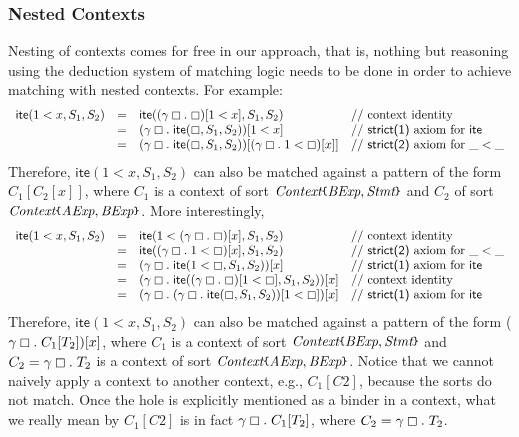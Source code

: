 \documentclass[UTF8,11pt]{article}
\theoremstyle{plain}
\theoremstyle{definition}
\theoremstyle{remark}
\newcommand{\Context}{\textit{Context}}
\newcommand{\hole}{\boxempty}
\newcommand{\AExp}{\textit{AExp}}
\newcommand{\BExp}{\textit{BExp}}
\newcommand{\Stmt}{\textit{Stmt}}
\newcommand{\ite}{\textsf{ite}}
\newcommand{\parametric}[2]{{#1}\raisebox{.2ex}{\texttt{\footnotesize{\{}}}#2\raisebox{.2ex}{\texttt{\footnotesize{\}}}}}
\begin{document}
\subsubsection{Nested Contexts}

Nesting of contexts comes for free in our approach, that is, nothing but
reasoning using the deduction system of matching logic needs to be done
in order to achieve matching with nested contexts.
For example:
$$
\begin{array}{rcll}
\ite(1 < x,S_1,S_2) & = &
\ite((\gamma\hole.\;\hole)[1 < x],S_1,S_2)
& \textrm{// context identity}
\\
& = &
(\gamma\hole.\;\ite(\hole,S_1,S_2))[1 < x]
& \textrm{// \textsf{strict(1)} axiom for $\ite$}
\\
& = &
(\gamma\hole.\;\ite(\hole,S_1,S_2))[(\gamma\hole.\;1 < \hole)[x]]
& \textrm{// \textsf{strict(2)} axiom for $\_<\_$}
\end{array}
$$
Therefore, $\ite(1 < x,S_1,S_2)$ can also be matched against a pattern
of the form $C_1[C_2[x]]$, where $C_1$ is a context of sort
$\parametric{\Context}{\BExp,\Stmt}$ and $C_2$ of sort
$\parametric{\Context}{\AExp,\BExp}$.
More interestingly,
$$
\begin{array}{rcll}
\ite(1 < x,S_1,S_2) & = &
\ite(1 < (\gamma\hole.\;\hole)[x],S_1,S_2)
& \textrm{// context identity}
\\
& = &
\ite((\gamma\hole.\;1 < \hole)[x],S_1,S_2)
& \textrm{// \textsf{strict(2)} axiom for $\_<\_$}
\\
& = &
(\gamma\hole.\;\ite(1 < \hole,S_1,S_2))[x]
& \textrm{// \textsf{strict(1)} axiom for $\ite$}
\\
& = &
(\gamma\hole.\;\ite((\gamma\hole.\;\hole)[1 < \hole],S_1,S_2))[x]
& \textrm{// context identity}
\\
& = &
(\gamma\hole.\;(\gamma\hole.\;\ite(\hole,S_1,S_2))[1 < \hole])[x]
& \textrm{// \textsf{strict(1)} axiom for $\ite$}
\end{array}
$$
Therefore, $\ite(1 < x,S_1,S_2)$ can also be matched against a pattern
of the form ($\gamma\hole.\;C_1[T_2])[x]$, where $C_1$ is a context of
sort $\parametric{\Context}{\BExp,\Stmt}$ and $C_2 = \gamma\hole.\;T_2$ is
a context of sort $\parametric{\Context}{\AExp,\BExp}$.
Notice that we cannot naively apply a context to another context, e.g.,
$C_1[C2]$, because the sorts do not match.
Once the hole is explicitly mentioned as a binder in a context, what we really
mean by $C_1[C2]$ is in fact $\gamma\hole.\;C_1[T_2]$, where
$C_2 = \gamma\hole.\;T_2$.
\end{document}
